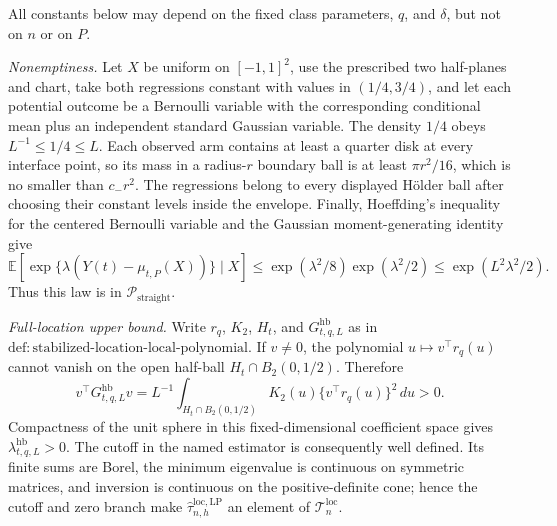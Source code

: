 All constants below may depend on the fixed class parameters, \(q\), and \(\delta\), but not on \(n\) or on \(P\).

\emph{Nonemptiness.}  Let \(X\) be uniform on \([-1,1]^2\), use the prescribed two half-planes and chart, take both regressions constant with values in \((1/4,3/4)\), and let each potential outcome be a Bernoulli variable with the corresponding conditional mean plus an independent standard Gaussian variable.  The density \(1/4\) obeys \(L^{-1}\leq 1/4\leq L\).  Each observed arm contains at least a quarter disk at every interface point, so its mass in a radius-\(r\) boundary ball is at least \(\pi r^2/16\), which is no smaller than \(c_-r^2\).  The regressions belong to every displayed H\"older ball after choosing their constant levels inside the envelope.  Finally, Hoeffding's inequality for the centered Bernoulli variable and the Gaussian moment-generating identity give
\[
 \mathbb E\!\left[\exp\{\lambda(Y(t)-\mu_{t,P}(X))\}\mid X\right]
 \leq \exp(\lambda^2/8)\exp(\lambda^2/2)
 \leq \exp(L^2\lambda^2/2).
\]
Thus this law is in \(\mathcal P_{\mathrm{straight}}\).

\emph{Full-location upper bound.}  Write \(r_q\), \(K_2\), \(H_t\), and \(G^{\mathrm{hb}}_{t,q,L}\) as in \(\mathrm{def:stabilized\text{-}location\text{-}local\text{-}polynomial}\).  If \(v\neq0\), the polynomial \(u\mapsto v^\top r_q(u)\) cannot vanish on the open half-ball \(H_t\cap B_2(0,1/2)\).  Therefore
\[
 v^\top G^{\mathrm{hb}}_{t,q,L}v
 =L^{-1}\int_{H_t\cap B_2(0,1/2)}K_2(u)
 \{v^\top r_q(u)\}^2\,du>0.
\]
Compactness of the unit sphere in this fixed-dimensional coefficient space gives \(\lambda^{\mathrm{hb}}_{t,q,L}>0\).  The cutoff in the named estimator is consequently well defined.  Its finite sums are Borel, the minimum eigenvalue is continuous on symmetric matrices, and inversion is continuous on the positive-definite cone; hence the cutoff and zero branch make \(\widehat\tau^{\mathrm{loc},\mathrm{LP}}_{n,h}\) an element of \(\mathcal T_n^{\mathrm{loc}}\).

